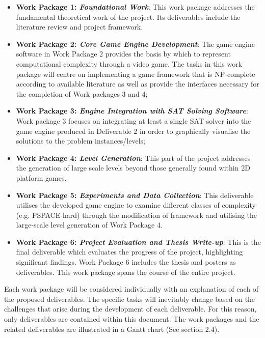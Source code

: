 \documentclass[a4paper]{article}
\begin{document}
\begin{itemize}

  \item \textbf{Work Package 1: \textit{Foundational Work}}: This work package addresses the fundamental theoretical work of the project. Its deliverables include the literature review and project framework.     \vspace{-3mm} 
  \item \textbf{Work Package 2: \textit{Core Game Engine Development}}: The game engine software in Work Package 2 provides the basis by which to represent computational complexity through a video game. The tasks in this work package will centre on implementing a game framework that is NP-complete according to available literature as well as provide the interfaces necessary for the completion of Work packages 3 and 4;          \vspace{-3mm} 

  \item \textbf{Work Package 3: \textit{Engine Integration with SAT Solving Software}}: Work package
   3 focuses on integrating at least a single SAT solver into the game engine produced in
   Deliverable 2 in order to graphically visualise the solutions to the problem
   instances/levels;\vspace{-3mm}


\item \textbf{Work Package 4: \textit{Level Generation}}: This part of the project addresses the generation of large scale levels beyond those generally found within 2D platform games.\vspace{-3mm} 
  \item \textbf{Work Package 5: \textit{Experiments and Data Collection}}: This deliverable utilises the developed game engine to examine different classes of complexity (e.g. PSPACE-hard) through the modification of framework and utilising the large-scale level generation of Work Package 4.\vspace{-3mm} 
  \item \textbf{Work Package 6: \textit{Project Evaluation and Thesis Write-up}}: This is the final deliverable which evaluates the progress of the project, highlighting significant findings. Work Package 6 includes the thesis and posters as deliverables. This work package spans the course of the entire project.


\end{itemize}

\noindent Each work package will be considered individually with an explanation of each of the proposed
deliverables. The specific tasks will inevitably change based on the challenges that arise during
the development of each deliverable. For this reason, only deliverables are contained within this
document. The work packages and the related deliverables are illustrated in a Gantt chart (See section
2.4).
\end{document}

